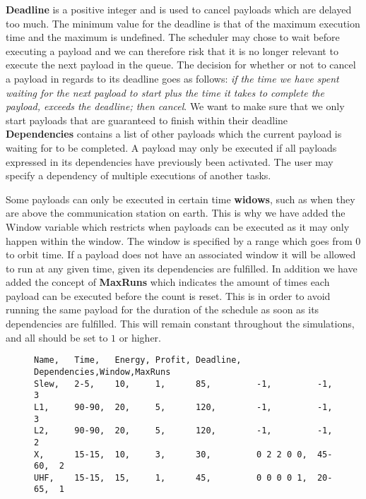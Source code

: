 \textbf{Deadline} is a positive integer and is used to cancel payloads which are delayed too much.
The minimum value for the deadline is that of the maximum execution time and the maximum is undefined.
The scheduler may chose to wait before executing a payload and we can therefore risk that it is no longer relevant to execute the next payload in the queue.
The decision for whether or not to cancel a payload in regards to its deadline goes as follows: \textit{if the time we have spent waiting for the next payload to start plus the time it takes to complete the payload, exceeds the deadline; then cancel}. We want to make sure that we only start payloads that are guaranteed to finish within their deadline\\
\textbf{Dependencies} contains a list of other payloads which the current payload is waiting for to be completed. A payload may only be executed if all payloads expressed in its dependencies have previously been activated. The user may specify a dependency of multiple executions of another tasks.

Some payloads can only be executed in certain time \textbf{widows}, such as when they are above the communication station on earth.
This is why we have added the Window variable which restricts when payloads can be executed as it may only happen within the window. The window is specified by a range which goes from 0 to orbit time. If a payload does not have an associated window it will be allowed to run at any given time, given its dependencies are fulfilled.
In addition we have added the concept of \textbf{MaxRuns} which indicates the amount of times each payload can be executed before the count is reset. This is in order to avoid running the same payload for the duration of the schedule as soon as its dependencies are fulfilled. This will remain constant throughout the simulations, and all should be set to $1$ or higher. 
\begin{figure}[H]
\begin{lstlisting}[caption={Example of how five payloads can be defined}, label=lst:csv, language=text]
Name,	Time,	Energy,	Profit,	Deadline,	Dependencies,Window,MaxRuns
Slew,	2-5,	10,		1,		85,			-1,			-1,		3
L1,		90-90,	20,		5,		120,		-1,			-1,		3
L2,		90-90,	20,		5,		120,		-1,			-1,		2
X,		15-15,	10,		3,		30,			0 2 2 0 0,	45-60,	2
UHF,	15-15,	15,		1,		45,			0 0 0 0 1,	20-65,	1
\end{lstlisting}
\end{figure}


